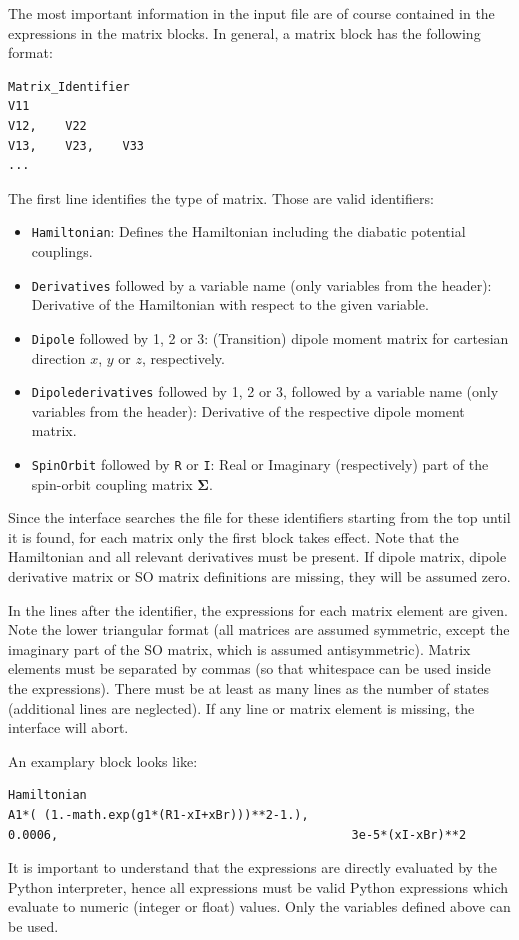 \documentclass[a4paper,11pt,DIV=15,openany,twoside=false]{scrbook}
\newcommand{\ttt}[1]{\texttt{#1}}
\newenvironment{example}{
  \vspace{0mm}
  \definecolor{shadecolor}{HTML}{BBDDFF}
  \begin{shaded}
  \begin{minipage}{0.9\textwidth}
}{
  \end{minipage}
  \end{shaded}
}
\begin{document}
The most important information in the input file are of course contained in the expressions in the matrix blocks. In general, a matrix block has the following format:
\begin{example}
  \begin{verbatim}
Matrix_Identifier
V11
V12,    V22
V13,    V23,    V33
...
  \end{verbatim}
\end{example}
The first line identifies the type of matrix. Those are valid identifiers:
\begin{itemize}
  \item \ttt{Hamiltonian}: Defines the Hamiltonian including the diabatic potential couplings.
  \item \ttt{Derivatives} followed by a variable name (only variables from the header): Derivative of the Hamiltonian with respect to the given variable.
  \item \ttt{Dipole} followed by 1, 2 or 3: (Transition) dipole moment matrix for cartesian direction $x$, $y$ or $z$, respectively.
  \item \ttt{Dipolederivatives} followed by 1, 2 or 3, followed by a variable name (only variables from the header): Derivative of the respective dipole moment matrix.
  \item \ttt{SpinOrbit} followed by \ttt{R} or \ttt{I}: Real or Imaginary (respectively) part of the spin-orbit coupling matrix $\boldsymbol{\Sigma}$.
\end{itemize}
Since the interface searches the file for these identifiers starting from the top until it is found, for each matrix only the first block takes effect. Note that the Hamiltonian and all relevant derivatives must be present. If dipole matrix, dipole derivative matrix or SO matrix definitions are missing, they will be assumed zero.

In the lines after the identifier, the expressions for each matrix element are given. Note the lower triangular format (all matrices are assumed symmetric, except the imaginary part of the SO matrix, which is assumed antisymmetric). Matrix elements must be separated by commas (so that whitespace can be used inside the expressions). There must be at least as many lines as the number of states (additional lines are neglected). If any line or matrix element is missing, the interface will abort.

An examplary block looks like:
\begin{example}
  \begin{verbatim}
Hamiltonian
A1*( (1.-math.exp(g1*(R1-xI+xBr)))**2-1.),
0.0006,                                         3e-5*(xI-xBr)**2
  \end{verbatim}
\end{example}
It is important to understand that the expressions are directly evaluated by the Python interpreter, hence all expressions must be valid Python expressions which evaluate to numeric (integer or float) values. Only the variables defined above can be used. 
\end{document}
